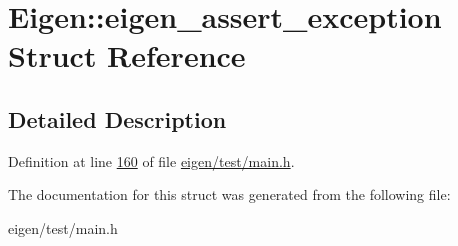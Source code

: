 \hypertarget{struct_eigen_1_1eigen__assert__exception}{}\section{Eigen\+:\+:eigen\+\_\+assert\+\_\+exception Struct Reference}
\label{struct_eigen_1_1eigen__assert__exception}


\subsection{Detailed Description}


Definition at line \hyperlink{eigen_2test_2main_8h_source_l00160}{160} of file \hyperlink{eigen_2test_2main_8h_source}{eigen/test/main.\+h}.



The documentation for this struct was generated from the following file\+:\begin{DoxyCompactItemize}
\item 
eigen/test/main.\+h\end{DoxyCompactItemize}
